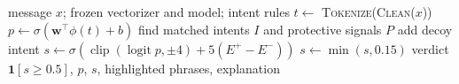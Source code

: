 \begin{algorithm}[H]
\caption{Scoring one message in the live service}
\begin{algorithmic}[1]
\Require message $x$; frozen vectorizer and model; intent rules
\State $t\gets$ \textsc{Tokenize}(\textsc{Clean}($x$))
\State $p\gets\sigma(\mathbf{w}^\top\phi(t)+b)$
\State find matched intents $I$ and protective signals $P$
 \State add decoy intent \EndIf
\State $s\gets\sigma(\operatorname{clip}(\operatorname{logit}p,\pm4)+5(E^+-E^-))$
 \State $s\gets\min(s,0.15)$ \EndIf
\State \Return verdict $\mathbf{1}[s\ge0.5]$, $p$, $s$, highlighted phrases, explanation
\end{algorithmic}
\end{algorithm}